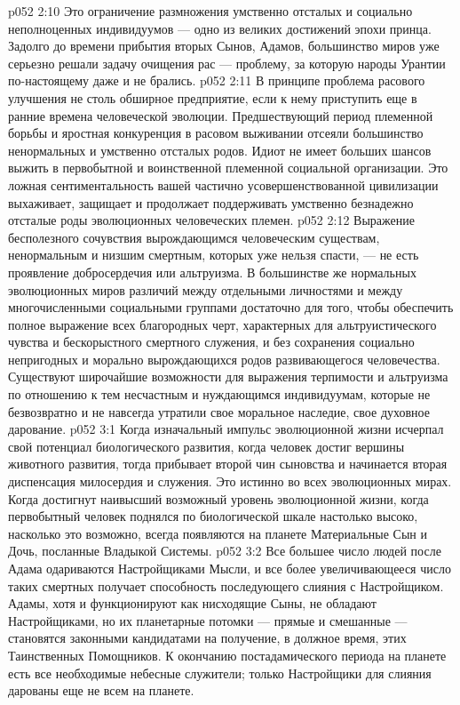 \vs p052 2:10 Это ограничение размножения умственно отсталых и социально неполноценных индивидуумов --- одно из великих достижений эпохи принца. Задолго до времени прибытия вторых Сынов, Адамов, большинство миров уже серьезно решали задачу очищения рас --- проблему, за которую народы Урантии по\hyp{}настоящему даже и не брались.
\vs p052 2:11 В принципе проблема расового улучшения не столь обширное предприятие, если к нему приступить еще в ранние времена человеческой эволюции. Предшествующий период племенной борьбы и яростная конкуренция в расовом выживании отсеяли большинство ненормальных и умственно отсталых родов. Идиот не имеет больших шансов выжить в первобытной и воинственной племенной социальной организации. Это ложная сентиментальность вашей частично усовершенствованной цивилизации выхаживает, защищает и продолжает поддерживать умственно безнадежно отсталые роды эволюционных человеческих племен.
\vs p052 2:12 Выражение бесполезного сочувствия вырождающимся человеческим существам, ненормальным и низшим смертным, которых уже нельзя спасти, --- не есть проявление добросердечия или альтруизма. В большинстве же нормальных эволюционных миров различий между отдельными личностями и между многочисленными социальными группами достаточно для того, чтобы обеспечить полное выражение всех благородных черт, характерных для альтруистического чувства и бескорыстного смертного служения, и без сохранения социально непригодных и морально вырождающихся родов развивающегося человечества. Существуют широчайшие возможности для выражения терпимости и альтруизма по отношению к тем несчастным и нуждающимся индивидуумам, которые не безвозвратно и не навсегда утратили свое моральное наследие, свое духовное дарование.
\vs p052 3:1 Когда изначальный импульс эволюционной жизни исчерпал свой потенциал биологического развития, когда человек достиг вершины животного развития, тогда прибывает второй чин сыновства и начинается вторая диспенсация милосердия и служения. Это истинно во всех эволюционных мирах. Когда достигнут наивысший возможный уровень эволюционной жизни, когда первобытный человек поднялся по биологической шкале настолько высоко, насколько это возможно, всегда появляются на планете Материальные Сын и Дочь, посланные Владыкой Системы.
\vs p052 3:2 Все большее число людей после Адама одариваются Настройщиками Мысли, и все более увеличивающееся число таких смертных получает способность последующего слияния с Настройщиком. Адамы, хотя и функционируют как нисходящие Сыны, не обладают Настройщиками, но их планетарные потомки --- прямые и смешанные --- становятся законными кандидатами на получение, в должное время, этих Таинственных Помощников. К окончанию постадамического периода на планете есть все необходимые небесные служители; только Настройщики для слияния дарованы еще не всем на планете.
